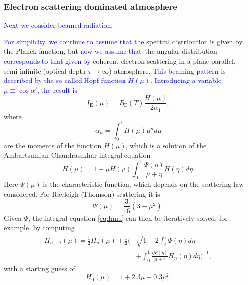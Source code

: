 \documentclass{aa}
\newcommand{\refe}[1]{\textcolor{blue}{{#1}}}
\newcommand{\refedel}[1]{}
\begin{document}
\subsubsection{Electron scattering dominated atmosphere}

\refe{Next we consider beamed radiation.}
\refedel{The second angular distribution we consider is the so-called `Hopf profile', which is no longer isotropic.}
\refe{For simplicity, we continue to assume that} the spectral distribution is given by the Planck function, but \refe{now we assume that} the angular distribution \refe{corresponds to that given by} coherent electron scattering \refe{in a} plane-parallel, semi-infinite (optical depth $\tau \rightarrow \infty$) atmosphere.
\refe{This beaming pattern is described by the so-called Hopf function $H(\mu)$.}
\refe{Introducing a variable $\mu \equiv \cos\alpha'$, the result is}
\begin{equation}\label{eq:hopf}
  I_{\mathrm{E}}(\mu) = B_{\mathrm{E}}(T) \frac{H(\mu)}{2\alpha_1},
\end{equation}
where
\begin{equation}
  \alpha_n = \int_0^1 H(\mu) \mu^n d\mu
\end{equation}
are the moments of the function $H(\mu)$, which is a solution of the Ambartsumian-Chandrasekhar integral equation \citep[see e.g.][]{Cha60,Sob63}
\begin{equation}\label{eq:hmu}
  H(\mu) = 1 + \mu H(\mu) \int_0^1 \frac{\Psi(\eta)}{\mu + \eta} H(\eta) d\eta.
\end{equation}
Here $\Psi(\mu)$ is the characteristic function, which depends on the scattering law considered.
For Rayleigh (Thomson) scattering it is
\begin{equation}
  \Psi(\mu) = \frac{3}{16}(3-\mu^2).
\end{equation}
Given $\Psi$, the integral equation \eqref{eq:hmu} can then be iteratively solved, for example, by computing
\begin{equation}\begin{split}
    H_{n+1}(\mu) =  \frac{1}{2} H_n(\mu) + \frac{1}{2}\Biggl(& \sqrt{1-2\int_0^1 \Psi(\eta)d\eta} \\
                    &+ \int_0^1 \frac{\eta \Psi(\eta)}{\mu + \eta} H_n(\eta) d\eta \Biggr)^{-1},
\end{split}\end{equation}
with a starting guess of
\begin{equation}\label{eq:apprx_hopf}
  H_0(\mu) = 1 + 2.3\mu - 0.3\mu^2.
\end{equation}
\end{document}
